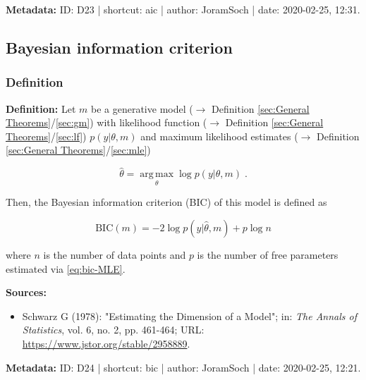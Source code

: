 \documentclass[a4paper,12pt,twoside]{book}
\begin{document}
\vspace{1em}
\textbf{Metadata:} ID: D23 | shortcut: aic | author: JoramSoch | date: 2020-02-25, 12:31.
\vspace{1em}



\subsection{Bayesian information criterion}

\subsubsection[\textit{Definition}]{Definition} \label{sec:bic}
\setcounter{equation}{0}

\textbf{Definition:} Let $m$ be a generative model ($\rightarrow$ Definition \ref{sec:General Theorems}/\ref{sec:gm}) with likelihood function ($\rightarrow$ Definition \ref{sec:General Theorems}/\ref{sec:lf}) $p(y \vert \theta, m)$ and maximum likelihood estimates ($\rightarrow$ Definition \ref{sec:General Theorems}/\ref{sec:mle})

\begin{equation} \label{eq:bic-MLE}
\hat{\theta} = \operatorname*{arg\,max}_\theta \log p(y | \theta, m) \; .
\end{equation}

Then, the Bayesian information criterion (BIC) of this model is defined as

\begin{equation} \label{eq:bic-BIC}
\mathrm{BIC}(m) = -2 \log p(y | \hat{\theta}, m) + p \log n
\end{equation}

where $n$ is the number of data points and $p$ is the number of free parameters estimated via \eqref{eq:bic-MLE}.


\vspace{1em}
\textbf{Sources:}
\begin{itemize}
\item Schwarz G (1978): "Estimating the Dimension of a Model"; in: \textit{The Annals of Statistics}, vol. 6, no. 2, pp. 461-464; URL: \url{https://www.jstor.org/stable/2958889}.
\end{itemize}


\vspace{1em}
\textbf{Metadata:} ID: D24 | shortcut: bic | author: JoramSoch | date: 2020-02-25, 12:21.
\vspace{1em}
\end{document}
